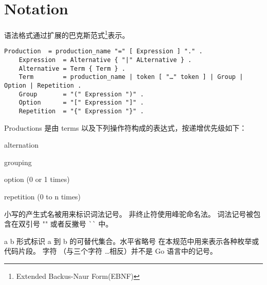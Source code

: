 
\chapter{Notation}
语法格式通过扩展的巴克斯范式\footnote{Extended Backus-Naur Form(EBNF)}表示。
\begin{lstlisting}[style=EBNF]
	Production	= production_name "=" [ Expression ] "." .
	Expression 	= Alternative { "|" ALternative } .
	Alternative = Term { Term } .
	Term        = production_name | token [ "…" token ] | Group | Option | Repetition .
	Group       = "(" Expression ")" .
	Option      = "[" Expression "]" .
	Repetition  = "{" Expression "}" .
\end{lstlisting}

Productions 是由 terms 以及下列操作符构成的表达式，按递增优先级如下：
\begin{description}[font=\ttfamily\bfseries, style=nextline, leftmargin=2\parindent, labelindent=\parindent]
	\item [|] alternation
	\item [()] grouping
	\item [{[]}] option (0 or 1 times)
	\item [\{\}] repetition (0 to n times)
\end{description}
小写的产生式名被用来标识词法记号。
非终止符使用峰驼命名法。
词法记号被包含在双引号 "" 或者反撇号 \lstinline|``| 中。

 a \hdots{} b 形式标识 a 到 b 的可替代集合。水平省略号 \hdots 在本规范中用来表示各种枚举或代码片段。
 字符 \hdots（与三个字符 \ldots 相反）并不是 Go 语言中的记号。